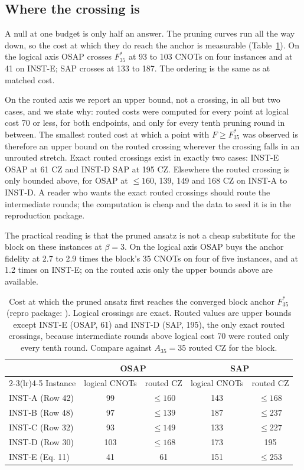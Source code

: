 \documentclass[11pt]{article}
\begin{document}
\subsection{Where the crossing is}

A null at one budget is only half an answer. The pruning curves run all the way down, so the cost at which they do reach the anchor is measurable (Table~\ref{tab:crossing}). On the logical axis OSAP crosses $F_{35}^{*}$ at 93 to 103 CNOTs on four instances and at 41 on INST-E; SAP crosses at 133 to 187. The ordering is the same as at matched cost.

On the routed axis we report an upper bound, not a crossing, in all but two cases, and we state why: routed costs were computed for every point at logical cost 70 or less, for both endpoints, and only for every tenth pruning round in between. The smallest routed cost at which a point with $F \geq F_{35}^{*}$ was observed is therefore an upper bound on the routed crossing wherever the crossing falls in an unrouted stretch. Exact routed crossings exist in exactly two cases: INST-E OSAP at 61 CZ and INST-D SAP at 195 CZ. Elsewhere the routed crossing is only bounded above, for OSAP at $\leq 160$, 139, 149 and 168 CZ on INST-A to INST-D. A reader who wants the exact routed crossings should route the intermediate rounds; the computation is cheap and the data to seed it is in the reproduction package.

The practical reading is that the pruned ansatz is not a cheap substitute for the block on these instances at $\beta = 3$. On the logical axis OSAP buys the anchor fidelity at 2.7 to 2.9 times the block's 35 CNOTs on four of five instances, and at 1.2 times on INST-E; on the routed axis only the upper bounds above are available.

\begin{table}[t]
\centering
\begin{tabular}{lcccc}
\toprule
 & \multicolumn{2}{c}{OSAP} & \multicolumn{2}{c}{SAP} \\
\cmidrule(lr){2-3}\cmidrule(lr){4-5}
Instance & logical CNOTs & routed CZ & logical CNOTs & routed CZ \\
\midrule
INST-A (Row 42) & 99 & $\leq 160$ & 143 & $\leq 168$ \\
INST-B (Row 48) & 97 & $\leq 139$ & 187 & $\leq 237$ \\
INST-C (Row 32) & 93 & $\leq 149$ & 133 & $\leq 227$ \\
INST-D (Row 30) & 103 & $\leq 168$ & 173 & 195 \\
INST-E (Eq. 11) & 41 & 61 & 151 & $\leq 253$ \\
\bottomrule
\end{tabular}
\caption[]{Cost at which the pruned ansatz first reaches the converged block anchor $F_{35}^{*}$ (repro package: ). Logical crossings are exact. Routed values are upper bounds except INST-E (OSAP, 61) and INST-D (SAP, 195), the only exact routed crossings, because intermediate rounds above logical cost 70 were routed only every tenth round. Compare against $A_{35} = 35$ routed CZ for the block.}
\label{tab:crossing}
\end{table}
\end{document}
